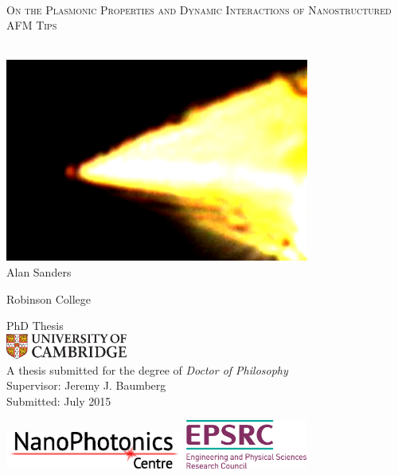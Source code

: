 \documentclass{book}
\begin{document}
\begin{titlepage}
    \centering
    ~\\[1.cm]
    \fontsize{20pt}{2.em}\selectfont
    \textsc{On the Plasmonic Properties and Dynamic Interactions of Nanostructured AFM Tips} \par ~\\
    \includegraphics[width=10cm]{title_image} \\
    \fontsize{14pt}{1em}\selectfont Alan Sanders \par
    \fontsize{12pt}{1em}\selectfont Robinson College \par
    PhD Thesis \\[0.5cm]
    \includegraphics[trim=0 0 270 0, clip, width=4cm]{uc-pantone} \\[0.5cm]
    A thesis submitted for the degree of \emph{Doctor of Philosophy} \\
    Supervisor: Jeremy J. Baumberg \\
    Submitted: July 2015 \par
    \vfill
    \flushleft
    \includegraphics[height=1.2cm]{np_logo_2}
    \hfill
    \includegraphics[height=1.6cm]{sponsor}
\end{titlepage}
\end{document}

